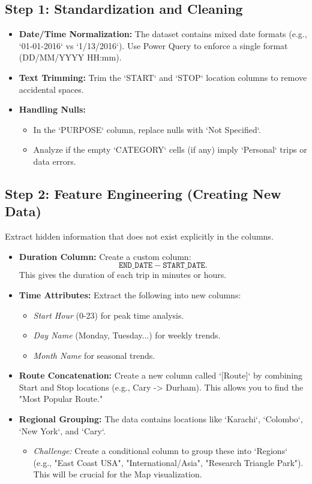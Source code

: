 \subsection{Step 1: Standardization and Cleaning}
\begin{itemize}
    \item \textbf{Date/Time Normalization:} The dataset contains mixed date formats (e.g., `01-01-2016` vs `1/13/2016`). Use Power Query to enforce a single format (DD/MM/YYYY HH:mm).
    \item \textbf{Text Trimming:} Trim the `START` and `STOP` location columns to remove accidental spaces.
    \item \textbf{Handling Nulls:} 
    \begin{itemize}
        \item In the `PURPOSE` column, replace nulls with `Not Specified`.
        \item Analyze if the empty `CATEGORY` cells (if any) imply `Personal` trips or data errors.
    \end{itemize}
\end{itemize}

\subsection{Step 2: Feature Engineering (Creating New Data)}
Extract hidden information that does not exist explicitly in the columns.
\begin{itemize}
    \item \textbf{Duration Column:} Create a custom column:\[
\texttt{END\_DATE} - \texttt{START\_DATE}.
\]
This gives the duration of each trip in minutes or hours.
    \item \textbf{Time Attributes:} Extract the following into new columns:
    \begin{itemize}
        \item \textit{Start Hour} (0-23) for peak time analysis.
        \item \textit{Day Name} (Monday, Tuesday...) for weekly trends.
        \item \textit{Month Name} for seasonal trends.
    \end{itemize}
    \item \textbf{Route Concatenation:} Create a new column called `[Route]` by combining Start and Stop locations (e.g., Cary -> Durham). This allows you to find the "Most Popular Route."
    \item \textbf{Regional Grouping:} The data contains locations like `Karachi`, `Colombo`, `New York`, and `Cary`. 
    \begin{itemize}
        \item \textit{Challenge:} Create a conditional column to group these into `Regions` (e.g., "East Coast USA", "International/Asia", "Research Triangle Park"). This will be crucial for the Map visualization.
    \end{itemize}
\end{itemize}

